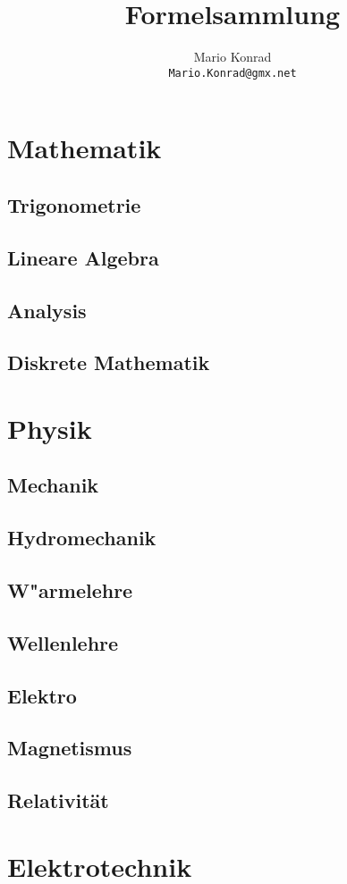 \documentclass[a4paper,10pt,twoside]{book}
\begin{document}
\title{Formelsammlung}
\author{Mario Konrad\\\texttt{Mario.Konrad@gmx.net}}
\maketitle
\tableofcontents

\part{Mathematik}
\chapter{Trigonometrie}
\chapter{Lineare Algebra}
\chapter{Analysis}
\chapter{Diskrete Mathematik}

\part{Physik}
\chapter{Mechanik}
\chapter{Hydromechanik}
\chapter{W"armelehre}
\chapter{Wellenlehre}
\chapter{Elektro}
\chapter{Magnetismus}
\chapter{Relativit\"at}

\part{Elektrotechnik}

\end{document}
